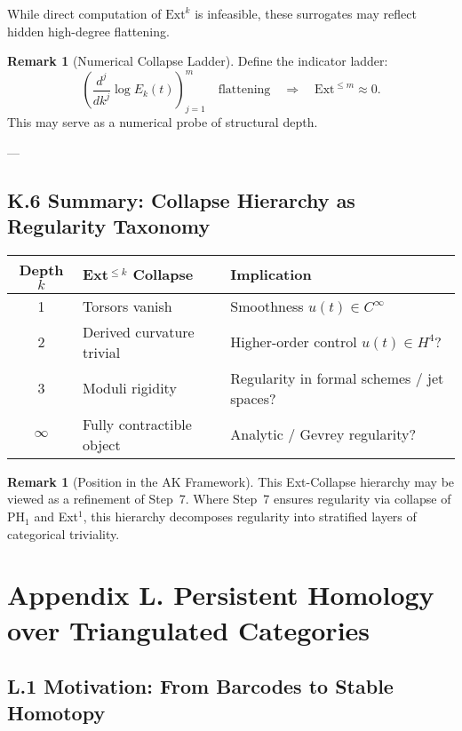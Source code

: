 \documentclass[11pt]{article}
\theoremstyle{definition}
\newtheorem{remark}[theorem]{Remark}
\begin{document}
While direct computation of \( \mathrm{Ext}^k \) is infeasible, these surrogates may reflect hidden high-degree flattening.

\begin{remark}[Numerical Collapse Ladder]
Define the indicator ladder:
\[
\left( \frac{d^j}{dk^j} \log E_k(t) \right)_{j=1}^m \quad \text{flattening} \quad \Rightarrow \quad \mathrm{Ext}^{\leq m} \approx 0.
\]
This may serve as a numerical probe of structural depth.
\end{remark}

---

\subsection*{K.6 Summary: Collapse Hierarchy as Regularity Taxonomy}

\begin{center}
\renewcommand{\arraystretch}{1.3}
\begin{tabular}{|c|l|l|}
\hline
\textbf{Depth \( k \)} & \textbf{Ext$^{\leq k}$ Collapse} & \textbf{Implication} \\
\hline
1 & Torsors vanish & Smoothness $u(t) \in C^\infty$ \\
2 & Derived curvature trivial & Higher-order control $u(t) \in H^4$? \\
3 & Moduli rigidity & Regularity in formal schemes / jet spaces? \\
$\infty$ & Fully contractible object & Analytic / Gevrey regularity? \\
\hline
\end{tabular}
\end{center}

\begin{remark}[Position in the AK Framework]
This Ext-Collapse hierarchy may be viewed as a refinement of Step~7.  
Where Step~7 ensures regularity via collapse of $\mathrm{PH}_1$ and Ext$^1$,  
this hierarchy decomposes regularity into stratified layers of categorical triviality.
\end{remark}


\section*{Appendix L. Persistent Homology over Triangulated Categories}

\subsection*{L.1 Motivation: From Barcodes to Stable Homotopy}
\end{document}
